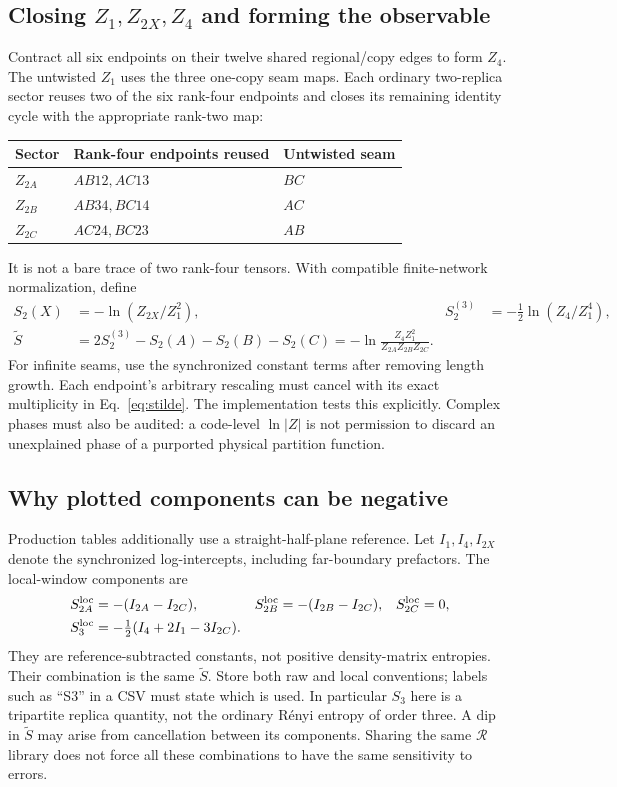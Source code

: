 \documentclass[11pt]{article}
\newcommand{\tS}{\widetilde S}
\begin{document}
\subsection{Closing $Z_1,Z_{2X},Z_4$ and forming the observable}
Contract all six endpoints on their twelve shared regional/copy edges to form
$Z_4$. The untwisted $Z_1$ uses the three one-copy seam maps. Each ordinary
two-replica sector reuses two of the six rank-four endpoints and closes its
remaining identity cycle with the appropriate rank-two map:
\begin{center}\small
\begin{tabular}{lll}\toprule
Sector & Rank-four endpoints reused & Untwisted seam\\\midrule
$Z_{2A}$ & $AB12,AC13$ & $BC$\\
$Z_{2B}$ & $AB34,BC14$ & $AC$\\
$Z_{2C}$ & $AC24,BC23$ & $AB$\\\bottomrule
\end{tabular}
\end{center}
It is not a bare trace of two rank-four tensors. With compatible finite-network
normalization, define
\begin{align}
 S_2(X)&=-\ln(Z_{2X}/Z_1^2),&
 S_2^{(3)}&=-\tfrac12\ln(Z_4/Z_1^4),\\
 \tS&=2S_2^{(3)}-S_2(A)-S_2(B)-S_2(C)
      =-\ln\frac{Z_4Z_1^2}{Z_{2A}Z_{2B}Z_{2C}}.\label{eq:stilde}
\end{align}
For infinite seams, use the synchronized constant terms after removing length
growth. Each endpoint's arbitrary rescaling must cancel with its exact
multiplicity in Eq.~\eqref{eq:stilde}. The implementation tests this explicitly.
Complex phases must also be audited: a code-level $\ln|Z|$ is not permission
to discard an unexplained phase of a purported physical partition function.

\ifdetailed
\subsection{Why plotted components can be negative}
Production tables additionally use a straight-half-plane reference. Let
$I_1,I_4,I_{2X}$ denote the synchronized log-intercepts, including far-boundary
prefactors. The local-window components are
\begin{align}
 S_{2A}^{\rm loc}&=-(I_{2A}-I_{2C}),&
 S_{2B}^{\rm loc}&=-(I_{2B}-I_{2C}),& S_{2C}^{\rm loc}&=0,\\
 S_3^{\rm loc}&=-\tfrac12(I_4+2I_1-3I_{2C}).
\end{align}
They are reference-subtracted constants, not positive density-matrix entropies.
Their combination is the same $\tS$. Store both raw and local conventions;
labels such as ``S3'' in a CSV must state which is used. In particular $S_3$
here is a tripartite replica quantity, not the ordinary R\'enyi entropy of order
three. A dip in $\tS$ may arise from cancellation between its components.
Sharing the same $\mathcal R$ library does not force all these combinations
to have the same sensitivity to errors.
\end{document}
